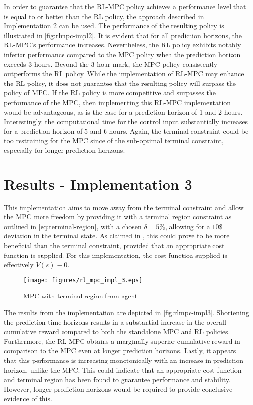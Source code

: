 In order to guarantee that the RL-MPC policy achieves a performance level that is equal to or better than the RL policy, the approach described in Implementation 2 can be used.  The performance of the resulting policy is illustrated in \autoref{fig:rlmpc-impl2}. It is evident that for all prediction horizons, the RL-MPC's performance increases.  Nevertheless, the RL policy exhibits notably inferior performance compared to the MPC policy when the prediction horizon exceeds 3 hours. Beyond the 3-hour mark, the MPC policy consistently outperforms the RL policy.  While the implementation of RL-MPC may enhance the RL policy, it does not guarantee that the resulting policy will surpass the policy of MPC. If the RL policy is more competitive and surpasses the performance of the MPC, then implementing this RL-MPC implementation would be advantageous, as is the case for a prediction horizon of 1 and 2 hours.\\
Interestingly, the computational time for the control input substantially increases for a prediction horizon of 5 and 6 hours. Again, the terminal constraint could be too restraining for the MPC since of the sub-optimal terminal constraint, especially for longer prediction horizons.

\section{Results - Implementation 3}
This implementation aims to move away from the terminal constraint and allow the MPC more freedom by providing it with a terminal region constraint as outlined in \autoref{eq:terminal-region}, with a chosen $\delta = 5\%$, allowing for a $10\$$ deviation in the terminal state. As claimed in \cite{amritEconomicOptimizationUsing2011}, this could prove to be more beneficial than the terminal constraint, provided that an appropriate cost function is supplied. For this implementation, the cost function supplied is effectively $V(s) \equiv 0$. 


\begin{figure}[H]
	\centering
	\texttt{[image: figures/rl\_mpc\_impl\_3.eps]}
	\caption{MPC with terminal region from agent}
	\label{fig:rlmpc-impl3}
\end{figure}

The results from the implementation are depicted in \autoref{fig:rlmpc-impl3}. Shortening the prediction time horizons results in a substantial increase in the overall cumulative reward compared to both the standalone MPC and RL policies. Furthermore, the RL-MPC obtains a marginally superior cumulative reward in comparison to the MPC even at longer prediction horizons. Lastly, it appears that this performance is increasing monotonically with an increase in prediction horizon, unlike the MPC. This could indicate that an appropriate cost function and terminal region has been found to  guarantee performance and stability. However, longer prediction horizons would be required to provide conclusive evidence of this.\\

